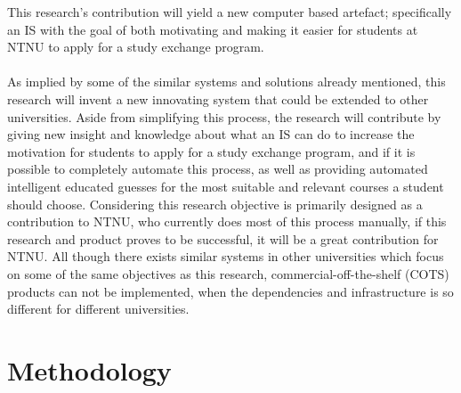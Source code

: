 This research's contribution will yield a new computer based artefact; specifically an IS with the goal of both motivating and making it easier for students at NTNU to apply for a study exchange program.
\\\\
As implied by some of the similar systems and solutions already mentioned, this research will invent a new innovating system that could be extended to other universities. Aside from simplifying this process, the research will contribute by giving new insight and knowledge about what an IS can do to increase the motivation for students to apply for a study exchange program, and if it is possible to completely automate this process, as well as providing automated intelligent educated guesses for the most suitable and relevant courses a student should choose. Considering this research objective is primarily designed as a contribution to NTNU, who currently does most of this process manually, if this research and product proves to be successful, it will be a great contribution for NTNU. All though there exists similar systems in other universities which focus on some of the same objectives as this research, commercial-off-the-shelf (COTS) products can not be implemented, when the dependencies and infrastructure is so different for different universities.

\section{Methodology}

